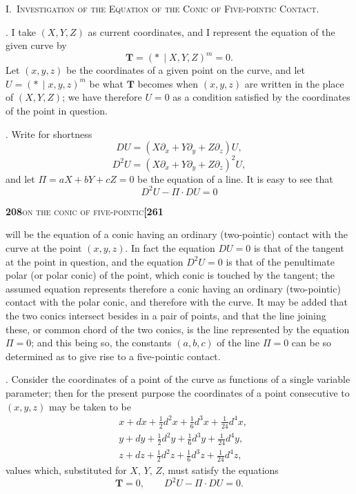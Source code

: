 \documentclass[11pt]{article}
\newcommand{\Cdel}{\mid}
\begin{document}
\bigskip

\begin{center}
\textsc{I.\ Investigation of the Equation of the Conic of Five-pointic Contact.}
\end{center}

\medskip

. I take $(X, Y, Z)$ as current coordinates, and I represent the equation of the given curve by
\[
\mathbf{T} = (*\,\Cdel X, Y, Z)^m = 0.
\]
Let $(x, y, z)$ be the coordinates of a given point on the curve, and let $U = (*\,\Cdel x, y, z)^m$ be what $\mathbf{T}$ becomes when $(x, y, z)$ are written in the place of $(X, Y, Z)$; we have therefore $U = 0$ as a condition satisfied by the coordinates of the point in question.

\medskip

. Write for shortness
\[
DU = (X\partial_x + Y\partial_y + Z\partial_z)U,
\]
\[
D^2U = (X\partial_x + Y\partial_y + Z\partial_z)^2 U,
\]
and let $\Pi = aX + bY + cZ = 0$ be the equation of a line. It is easy to see that
\[
D^2 U - \Pi \cdot DU = 0
\]

\newpage

\noindent\textbf{208}\hfill\textsc{on the conic of five-pointic}\hfill\textbf{[261}

\medskip

\noindent will be the equation of a conic having an ordinary (two-pointic) contact with the curve at the point $(x, y, z)$. In fact the equation $DU = 0$ is that of the tangent at the point in question, and the equation $D^2 U = 0$ is that of the penultimate polar (or polar conic) of the point, which conic is touched by the tangent; the assumed equation represents therefore a conic having an ordinary (two-pointic) contact with the polar conic, and therefore with the curve. It may be added that the two conics intersect besides in a pair of points, and that the line joining these, or common chord of the two conics, is the line represented by the equation $\Pi = 0$; and this being so, the constants $(a, b, c)$ of the line $\Pi = 0$ can be so determined as to give rise to a five-pointic contact.

\medskip

. Consider the coordinates of a point of the curve as functions of a single variable parameter; then for the present purpose the coordinates of a point consecutive to $(x, y, z)$ may be taken to be
\[
\begin{aligned}
&x + dx + \tfrac{1}{2}d^2x + \tfrac{1}{6}d^3x + \tfrac{1}{24}d^4x,\\
&y + dy + \tfrac{1}{2}d^2y + \tfrac{1}{6}d^3y + \tfrac{1}{24}d^4y,\\
&z + dz + \tfrac{1}{2}d^2z + \tfrac{1}{6}d^3z + \tfrac{1}{24}d^4z,
\end{aligned}
\]
values which, substituted for $X$, $Y$, $Z$, must satisfy the equations
\[
\mathbf{T} = 0,\qquad D^2U - \Pi \cdot DU = 0.
\]
\end{document}
